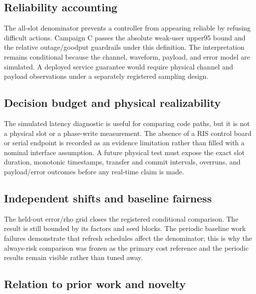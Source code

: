 \documentclass[10pt,twocolumn]{article}
\begin{document}
\subsection{Reliability accounting}\label{reliability-accounting}

The all-slot denominator prevents a controller from appearing reliable
by refusing difficult actions. Campaign C passes the absolute weak-user
upper95 bound and the relative outage/goodput guardrails under this
definition. The interpretation remains conditional because the channel,
waveform, payload, and error model are simulated. A deployed service
guarantee would require physical channel and payload observations under
a separately registered sampling design.

\subsection{Decision budget and physical
realizability}\label{decision-budget-and-physical-realizability}

The simulated latency diagnostic is useful for comparing code paths, but
it is not a physical slot or a phase-write measurement. The absence of a
RIS control board or serial endpoint is recorded as an evidence
limitation rather than filled with a nominal interface assumption. A
future physical test must expose the exact slot duration, monotonic
timestamps, transfer and commit intervals, overruns, and payload/error
outcomes before any real-time claim is made.

\subsection{Independent shifts and baseline
fairness}\label{independent-shifts-and-baseline-fairness}

The held-out error/rho grid closes the registered conditional
comparison. The result is still bounded by its factors and seed blocks.
The periodic baseline work failures demonstrate that refresh schedules
affect the denominator; this is why the always-risk comparison was
frozen as the primary cost reference and the periodic results remain
visible rather than tuned away.

\subsection{Relation to prior work and
novelty}\label{relation-to-prior-work-and-novelty}
\end{document}
